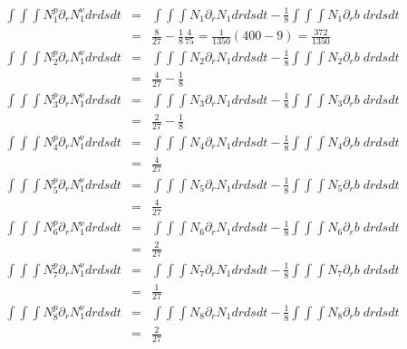 \begin{eqnarray}
\int\int\int N_1^p\partial_r N_1^\upnu drdsdt &=&   
\int\int\int N_1\partial_r N_1 drdsdt -\frac{1}{8}  \int\int\int N_1\partial_r b\; drdsdt  \\ 
&=& \frac{8}{27} - \frac{1}{8} \frac{4}{75} = \frac{1}{1350}( 400 - 9 ) =  \frac{372}{1350} \\ 
\int\int\int N_2^p\partial_r N_1^\upnu drdsdt &=&   
\int\int\int N_2\partial_r N_1 drdsdt -\frac{1}{8}  \int\int\int N_2\partial_r b\; drdsdt  \\  
&=& \frac{4}{27} - \frac{1}{8} \\
\int\int\int N_3^p\partial_r N_1^\upnu drdsdt &=&   
\int\int\int N_3\partial_r N_1 drdsdt -\frac{1}{8}  \int\int\int N_3\partial_r b\; drdsdt  \\  
&=& \frac{2}{27} -\frac{1}{8} \\
\int\int\int N_4^p\partial_r N_1^\upnu drdsdt &=&   
\int\int\int N_4\partial_r N_1 drdsdt -\frac{1}{8}  \int\int\int N_4\partial_r b\; drdsdt  \\  
&=& \frac{4}{27} \\
\int\int\int N_5^p\partial_r N_1^\upnu drdsdt &=&   
\int\int\int N_5\partial_r N_1 drdsdt -\frac{1}{8}  \int\int\int N_5\partial_r b\; drdsdt  \\  
&=& \frac{4}{27} \\
\int\int\int N_6^p\partial_r N_1^\upnu drdsdt &=&   
\int\int\int N_6\partial_r N_1 drdsdt -\frac{1}{8}  \int\int\int N_6\partial_r b\; drdsdt  \\  
&=& \frac{2}{27} \\
\int\int\int N_7^p\partial_r N_1^\upnu drdsdt &=&   
\int\int\int N_7\partial_r N_1 drdsdt -\frac{1}{8}  \int\int\int N_7\partial_r b\; drdsdt  \\  
&=& \frac{1}{27} \\
\int\int\int N_8^p\partial_r N_1^\upnu drdsdt &=&   
\int\int\int N_8\partial_r N_1 drdsdt -\frac{1}{8}  \int\int\int N_8\partial_r b\; drdsdt  \\  
&=& \frac{2}{27} \\
\end{eqnarray}




